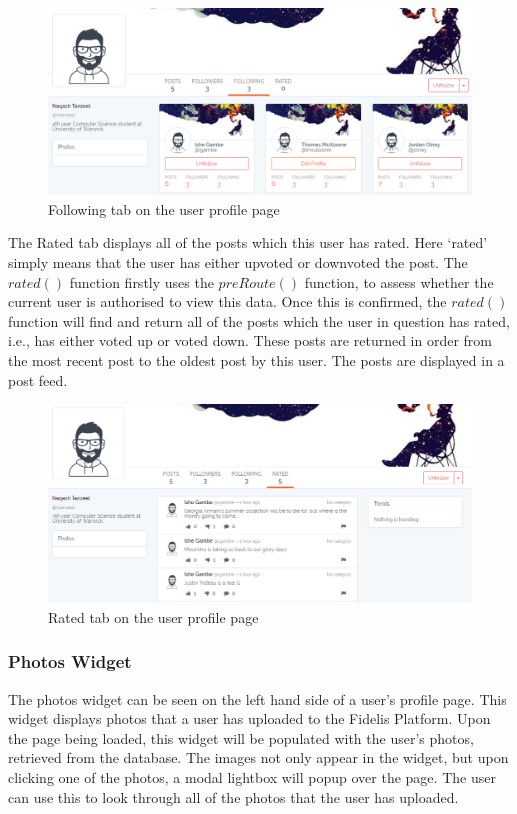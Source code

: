 \begin{figure}[H]
\centering
\includegraphics[width=\textwidth]{Images/Implementation/ProfileFollowing}
\caption{Following tab on the user profile page}
\label{fig:ProfileFollowing}
\end{figure}

The Rated tab displays all of the posts which this user has rated. Here `rated' simply means that the user has either upvoted or downvoted the post. The \(rated()\) function firstly uses the \(preRoute()\) function, to assess whether the current user is authorised to view this data. Once this is confirmed, the \(rated()\) function will find and return all of the posts which the user in question has rated, i.e., has either voted up or voted down. These posts are returned in order from the most recent post to the oldest post by this user. The posts are displayed in a post feed.

\begin{figure}[H]
\centering
\includegraphics[width=\textwidth]{Images/Implementation/ProfileRated}
\caption{Rated tab on the user profile page}
\label{fig:ProfileRated}
\end{figure}

\subsubsection{Photos Widget}
The photos widget can be seen on the left hand side of a user's profile page. This widget displays photos that a user has uploaded to the Fidelis Platform. Upon the page being loaded, this widget will be populated with the user's photos, retrieved from the database. The images not only appear in the widget, but upon clicking one of the photos, a modal lightbox will popup over the page. The user can use this to look through all of the photos that the user has uploaded.

